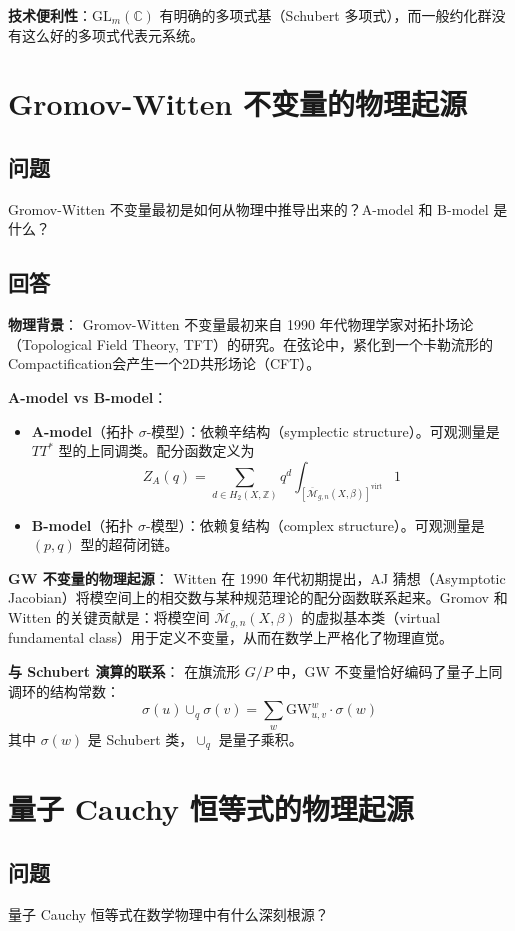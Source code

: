 \textbf{技术便利性}：$\mathrm{GL}_m(\mathbb{C})$ 有明确的多项式基（Schubert 多项式），而一般约化群没有这么好的多项式代表元系统。

\section{Gromov-Witten 不变量的物理起源}\label{sec:GW-physics-origin}
\subsection{问题}
Gromov-Witten 不变量最初是如何从物理中推导出来的？A-model 和 B-model 是什么？

\subsection{回答}
\textbf{物理背景}：
Gromov-Witten 不变量最初来自 1990 年代物理学家对拓扑场论（Topological Field Theory, TFT）的研究。在弦论中，紧化到一个卡勒流形的Compactification会产生一个2D共形场论（CFT）。

\textbf{A-model vs B-model}：
\begin{itemize}
\item \textbf{A-model}（拓扑 $\sigma$-模型）：依赖辛结构（symplectic structure）。可观测量是 $TT^*$ 型的上同调类。配分函数定义为
$$Z_A(q) = \sum_{d \in H_2(X,\mathbb{Z})} q^d \int_{[\overline{\mathcal{M}}_{g,n}(X,\beta)]^{\text{virt}}} 1$$
\item \textbf{B-model}（拓扑 $\sigma$-模型）：依赖复结构（complex structure）。可观测量是 $(p,q)$ 型的超荷闭链。
\end{itemize}

\textbf{GW 不变量的物理起源}：
Witten 在 1990 年代初期提出，AJ 猜想（Asymptotic Jacobian）将模空间上的相交数与某种规范理论的配分函数联系起来。Gromov 和 Witten 的关键贡献是：将模空间 $\overline{\mathcal{M}}_{g,n}(X,\beta)$ 的虚拟基本类（virtual fundamental class）用于定义不变量，从而在数学上严格化了物理直觉。

\textbf{与 Schubert 演算的联系}：
在旗流形 $G/P$ 中，GW 不变量恰好编码了量子上同调环的结构常数：
$$\sigma(u) \cup_q \sigma(v) = \sum_w \text{GW}_{u,v}^w \cdot \sigma(w)$$
其中 $\sigma(w)$ 是 Schubert 类，$\cup_q$ 是量子乘积。

\section{量子 Cauchy 恒等式的物理起源}\label{sec:cauchy-physics-origin}
\subsection{问题}
量子 Cauchy 恒等式在数学物理中有什么深刻根源？

